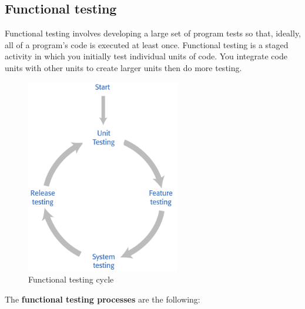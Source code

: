 \documentclass[10pt,a4paper]{report}
\begin{document}
\subsection{Functional testing}
 Functional testing involves developing a large set of program tests so that, ideally, all of a program’s code is executed at least once. Functional testing is a staged activity in which you initially test individual  units of code. You integrate code units with other units to create larger units then do more testing.
\begin{figure}[h]
	\centering
	\includegraphics[width=0.6\textwidth]{image104}
	\caption{Functional testing cycle}
	\label{image104}
\end{figure} 
 The \textbf{functional testing processes} are the following:
\end{document}

